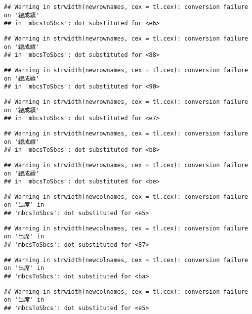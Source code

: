 \documentclass[
]{book}
\begin{document}
\begin{verbatim}
## Warning in strwidth(newrownames, cex = tl.cex): conversion failure on '總成績'
## in 'mbcsToSbcs': dot substituted for <e6>
\end{verbatim}

\begin{verbatim}
## Warning in strwidth(newrownames, cex = tl.cex): conversion failure on '總成績'
## in 'mbcsToSbcs': dot substituted for <88>
\end{verbatim}

\begin{verbatim}
## Warning in strwidth(newrownames, cex = tl.cex): conversion failure on '總成績'
## in 'mbcsToSbcs': dot substituted for <90>
\end{verbatim}

\begin{verbatim}
## Warning in strwidth(newrownames, cex = tl.cex): conversion failure on '總成績'
## in 'mbcsToSbcs': dot substituted for <e7>
\end{verbatim}

\begin{verbatim}
## Warning in strwidth(newrownames, cex = tl.cex): conversion failure on '總成績'
## in 'mbcsToSbcs': dot substituted for <b8>
\end{verbatim}

\begin{verbatim}
## Warning in strwidth(newrownames, cex = tl.cex): conversion failure on '總成績'
## in 'mbcsToSbcs': dot substituted for <be>
\end{verbatim}

\begin{verbatim}
## Warning in strwidth(newcolnames, cex = tl.cex): conversion failure on '出席' in
## 'mbcsToSbcs': dot substituted for <e5>
\end{verbatim}

\begin{verbatim}
## Warning in strwidth(newcolnames, cex = tl.cex): conversion failure on '出席' in
## 'mbcsToSbcs': dot substituted for <87>
\end{verbatim}

\begin{verbatim}
## Warning in strwidth(newcolnames, cex = tl.cex): conversion failure on '出席' in
## 'mbcsToSbcs': dot substituted for <ba>
\end{verbatim}

\begin{verbatim}
## Warning in strwidth(newcolnames, cex = tl.cex): conversion failure on '出席' in
## 'mbcsToSbcs': dot substituted for <e5>
\end{verbatim}
\end{document}
